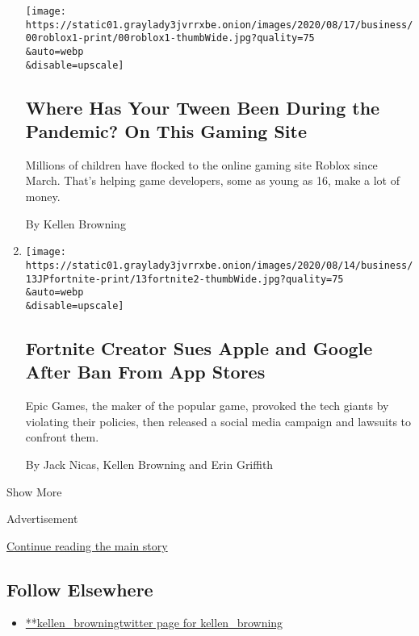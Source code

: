 \begin{enumerate}
  \texttt{[image: https://static01.graylady3jvrrxbe.onion/images/2020/08/17/business/00roblox1-print/00roblox1-thumbWide.jpg?quality=75\\\&auto=webp\\\&disable=upscale]}

  \hypertarget{where-has-your-tween-been-during-the-pandemic-on-this-gaming-site}{%
  \subsection{Where Has Your Tween Been During the Pandemic? On This
  Gaming
  Site}\label{where-has-your-tween-been-during-the-pandemic-on-this-gaming-site}}

  Millions of children have flocked to the online gaming site Roblox
  since March. That's helping game developers, some as young as 16, make
  a lot of money.

  By Kellen Browning
\item
  \href{/2020/08/13/technology/apple-fortnite-ban.html}{}

  \texttt{[image: https://static01.graylady3jvrrxbe.onion/images/2020/08/14/business/13JPfortnite-print/13fortnite2-thumbWide.jpg?quality=75\\\&auto=webp\\\&disable=upscale]}

  \hypertarget{fortnite-creator-sues-apple-and-google-after-ban-from-app-stores}{%
  \subsection{Fortnite Creator Sues Apple and Google After Ban From App
  Stores}\label{fortnite-creator-sues-apple-and-google-after-ban-from-app-stores}}

  Epic Games, the maker of the popular game, provoked the tech giants by
  violating their policies, then released a social media campaign and
  lawsuits to confront them.

  By Jack Nicas, Kellen Browning and Erin Griffith
\end{enumerate}

Show More

Advertisement

\protect\hyperlink{after-mid2}{Continue reading the main story}

\hypertarget{follow-elsewhere}{%
\subsection{Follow Elsewhere}\label{follow-elsewhere}}

\begin{itemize}
\tightlist
\item
  \href{https://twitter.com/kellen_browning}{**kellen\_browningtwitter
  page for kellen\_browning}
\end{itemize}

